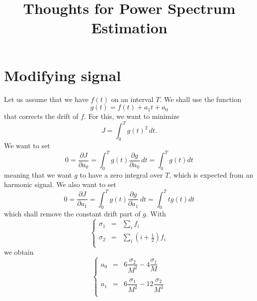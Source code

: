 \documentclass[aps,twocolumn]{revtex4}
\begin{document}
\title{Thoughts for Power Spectrum Estimation}
\maketitle

\section{Modifying signal}
Let us assume that we have $f(t)$ on an interval $T$.
We shall use the function
\begin{equation}
	g(t) = f(t) + a_1 t + a_0
\end{equation}
that corrects the drift of $f$.
For this, we want to minimize
\begin{equation}
	J = \int_0^T g(t)^2 \, dt.
\end{equation}
We want to set
\begin{equation}
0 = \dfrac{\partial J}{\partial a_0} = \int_0^T g(t)\dfrac{\partial g}{\partial a_0} \, dt = \int_0^T g(t) dt
\end{equation}
meaning that we want $g$ to have a zero integral over $T$, which is 
expected from an harmonic signal.
We also want to set
\begin{equation}
0 = \dfrac{\partial J}{\partial a_1} = \int_0^T g(t)\dfrac{\partial g}{\partial a_1} \, dt = \int_0^T t g(t) dt
\end{equation}
which shall remove the constant drift part of $g$.
With 
\begin{equation}
	\left\lbrace
	\begin{array}{rcl}
	\sigma_1 & = & \sum_i f_i \\
	\sigma_2 & = & \sum_i \left(i+\frac{1}{2}\right) f_i\\
	\end{array}
	\right.
\end{equation}
we obtain
\begin{equation}
	\left\lbrace
	\begin{array}{rcl}
	a_0 & = & 6 \dfrac{\sigma_2}{M^2} - 4 \dfrac{\sigma_1}{M}\\
	\\
	a_1 & = & 6 \dfrac{\sigma_1}{M^2} - 12 \dfrac{\sigma_2}{M^3}\\
	\end{array}
	\right.
\end{equation}
\end{document}
